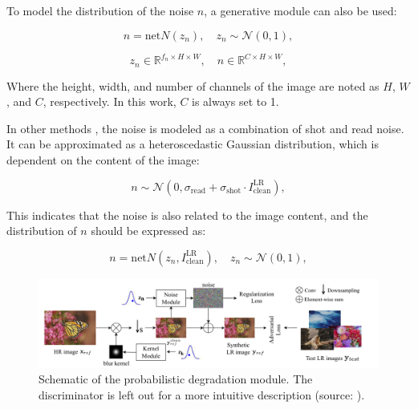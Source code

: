     
    To model the distribution of the noise $n$, a  generative module can also be used:

    \begin{equation}
        n = \text{net}N(z_n), \quad z_n \sim \mathcal{N}(0,1),
    \end{equation}

    \begin{equation}
        z_n \in \mathbb{R}^{f_n \times H \times W}, \quad n \in \mathbb{R}^{C \times H \times W },
    \end{equation}

    Where the height, width, and number of channels of the image are noted as $H$, $W$, and $C$, respectively. 
    In this work, $C$ is always set to 1.

    In other methods \cite{plotz2017benchmarking}, the noise is modeled as a combination of shot and read noise. 
    It can be approximated as a heteroscedastic Gaussian distribution, which is dependent on the content of the image:

    \begin{equation}
        n \sim \mathcal{N}(0, \sigma_{\text{read}} + \sigma_{\text{shot}} \cdot I^{\text{LR}}_{\text{clean}}),
    \end{equation}

    This indicates that the noise is also related to the image content, and the distribution of $n$ should be expressed as:


    \begin{equation}
        n = \text{net}N(z_n,I^{\text{LR}}_{\text{clean}}), \quad z_n \sim \mathcal{N}(0,1),
    \end{equation}

    \begin{figure}[h!]
        \centering
        \includegraphics[width=\textwidth]{Includes/3-probabilistic-degradation-model.png}
        \caption{Schematic of the probabilistic degradation module.
                The discriminator is left out for a more intuitive description (source: \cite{luo2022learning}).}
        \label{fig:3-probabilistic-degradation-model}
    \end{figure}

